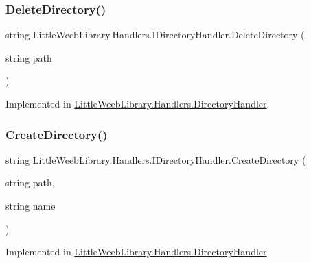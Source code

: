 \subsubsection{\texorpdfstring{Delete\+Directory()}{DeleteDirectory()}}
{\footnotesize\ttfamily string Little\+Weeb\+Library.\+Handlers.\+I\+Directory\+Handler.\+Delete\+Directory (\begin{DoxyParamCaption}\item[{string}]{path }\end{DoxyParamCaption})}



Implemented in \mbox{\hyperlink{class_little_weeb_library_1_1_handlers_1_1_directory_handler_aeae514c438e071fe95c42ff74e0fef9d}{Little\+Weeb\+Library.\+Handlers.\+Directory\+Handler}}.

\mbox{\label{interface_little_weeb_library_1_1_handlers_1_1_i_directory_handler_aa2298db37f9e9a6050d01be4d3150889}} 
\subsubsection{\texorpdfstring{Create\+Directory()}{CreateDirectory()}}
{\footnotesize\ttfamily string Little\+Weeb\+Library.\+Handlers.\+I\+Directory\+Handler.\+Create\+Directory (\begin{DoxyParamCaption}\item[{string}]{path,  }\item[{string}]{name }\end{DoxyParamCaption})}



Implemented in \mbox{\hyperlink{class_little_weeb_library_1_1_handlers_1_1_directory_handler_a6be1b158ee280e8a74a49917a90484e2}{Little\+Weeb\+Library.\+Handlers.\+Directory\+Handler}}.

\mbox{\label{interface_little_weeb_library_1_1_handlers_1_1_i_directory_handler_a43ca9f14498ef3b9cfbdf960b877ac19}} 
